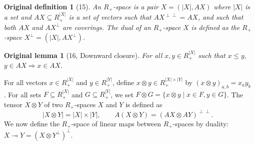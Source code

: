\documentclass[10pt,a4paper]{article}
\newcommand{\lolli}{\multimap}
\newtheorem*{originaldef}{Original definition}
\newtheorem*{originallemma}{Original lemma}
\begin{document}
\begin{originaldef}[15] An $R_+$-space is a pair $X=(|X|,AX)$ where $|X|$ is a set and $AX\subseteq R_+^{|X|}$ is a set of vectors such that $AX^{\perp\perp}=AX$, and such that both $AX$ and $AX^\perp$ are coverings. The dual of an $R_+$-space $X$ is defined as the $R_+$-space $X^\perp=(|X|,AX^\perp)$.\end{originaldef}
\begin{originallemma}[16, Downward closure] For all $x,y\in R_+^{|X|}$ such that $x\leq y$, $y\in AX\Rightarrow x\in AX$.\end{originallemma}
For all vectors $x\in R_+^{|X|}$ and $y\in R_+^{|Y|}$, define $x\otimes y\in R_+^{|X|\times|Y|}$ by $(x\otimes y)_{a,b}=x_ay_b$. For all sets $F\subseteq R_+^{|X|}$ and $G\subseteq R_+^{|Y|}$, we set $F\otimes G=\{x\otimes y\mid x\in F,y\in G\}$. The tensor $X\otimes Y$ of two $R_+$-spaces $X$ and $Y$ is defined as
\[|X\otimes Y|=|X|\times|Y|,\qquad A(X\otimes Y)=(AX\otimes AY)^{\perp\perp}.\]
We now define the $R_+$-space of linear maps between $R_+$-spaces by duality: $X\lolli Y=(X\otimes Y^\perp)^\perp$.
\end{document}
